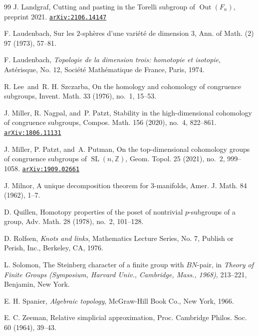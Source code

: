 \documentclass[11pt]{amsart}
\newcommand{\arxiv}[1]{\href{http://arxiv.org/abs/#1}{{\tt arXiv:#1}}}
\numberwithin{equation}{section}
\theoremstyle{plain}
\theoremstyle{definition}
\theoremstyle{remark}
\DeclareMathOperator{\SL}{SL}
\newcommand\Z{\ensuremath{\mathbb{Z}}}
\DeclareMathOperator{\Out}{Out}
\begin{document}
\begin{thebibliography}{99}
J. Landgraf, Cutting and pasting in the Torelli subgroup of $\Out(F_n)$, preprint 2021. \arxiv{2106.14147}

F. Laudenbach, Sur les $2$-sph\`eres d'une vari\'{e}t\'{e} de dimension $3$, Ann. of Math. (2) 97 (1973), 57--81. 

F. Laudenbach, {\it Topologie de la dimension trois: homotopie et isotopie}, Ast\'{e}risque, No. 12, Soci\'{e}t\'{e} Math\'{e}matique de France, Paris, 1974.

R. Lee\ and\ R. H. Szczarba, On the homology and cohomology of congruence subgroups, Invent. Math. 33 (1976), no.~1, 15--53. 

J. Miller, R. Nagpal, and\ P. Patzt, Stability in the high-dimensional cohomology of congruence subgroups, Compos. Math. 156 (2020), no.~4, 822--861. \arxiv{1806.11131}

J. Miller, P. Patzt, and\ A. Putman, On the top-dimensional cohomology groups of congruence subgroups of $\SL(n,\Z)$, Geom. Topol. 25 (2021), no.~2, 999--1058. \arxiv{1909.02661}

J. Milnor, A unique decomposition theorem for $3$-manifolds, Amer. J. Math. 84 (1962), 1--7.

D. Quillen, Homotopy properties of the poset of nontrivial $p$-subgroups of a group, Adv. Math. 28 (1978), no.~2, 101--128.

D. Rolfsen, {\it Knots and links}, Mathematics Lecture Series, No. 7, Publish or Perish, Inc., Berkeley, CA, 1976. 

L. Solomon, The Steinberg character of a finite group with $BN$-pair, in {\it Theory of Finite Groups (Symposium, Harvard Univ., Cambridge, Mass., 1968)}, 213--221, Benjamin, New York. 

E. H. Spanier, {\it Algebraic topology}, McGraw-Hill Book Co., New York, 1966.

E. C. Zeeman, Relative simplicial approximation, Proc. Cambridge Philos. Soc. 60 (1964), 39--43.

\end{thebibliography}
\end{document}
